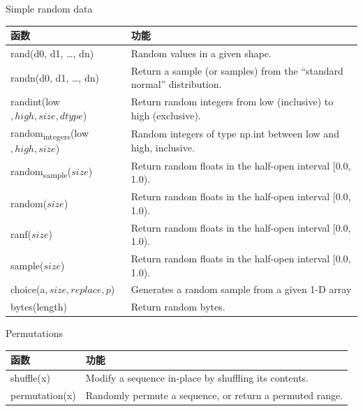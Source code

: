 \documentclass[ignorenonframetext,11pt,xcolor=dvipsnames,hyperref={colorlinks,allcolors=.,urlcolor=blue, citecolor=violet, bookmarksdepth=4},aspectratio=1610]{beamer}
\begin{document}
\begin{frame}{Simple random data}
\protect\hypertarget{simple-random-data}{}

\scriptsize

\begin{longtable}[]{@{}ll@{}}
\toprule
函数 & 功能\tabularnewline
\midrule
\endhead
rand(d0, d1, \ldots, dn) & Random values in a given
shape.\tabularnewline
randn(d0, d1, \ldots, dn) & Return a sample (or samples) from the
``standard normal'' distribution.\tabularnewline
randint(low\(, high, size, dtype\)) & Return random integers from low
(inclusive) to high (exclusive).\tabularnewline
random\textsubscript{integers}(low\(, high, size\)) & Random integers of
type np.int between low and high, inclusive.\tabularnewline
random\textsubscript{sample}(\(size\)) & Return random floats in the
half-open interval {[}0.0, 1.0).\tabularnewline
random(\(size\)) & Return random floats in the half-open interval
{[}0.0, 1.0).\tabularnewline
ranf(\(size\)) & Return random floats in the half-open interval {[}0.0,
1.0).\tabularnewline
sample(\(size\)) & Return random floats in the half-open interval
{[}0.0, 1.0).\tabularnewline
choice(a\(, size, replace, p\)) & Generates a random sample from a given
1-D array\tabularnewline
bytes(length) & Return random bytes.\tabularnewline
\bottomrule
\end{longtable}

\end{frame}

\begin{frame}{Permutations}
\protect\hypertarget{permutations}{}

\scriptsize

\begin{longtable}[]{@{}ll@{}}
\toprule
函数 & 功能\tabularnewline
\midrule
\endhead
shuffle(x) & Modify a sequence in-place by shuffling its
contents.\tabularnewline
permutation(x) & Randomly permute a sequence, or return a permuted
range.\tabularnewline
\bottomrule
\end{longtable}

\end{frame}
\end{document}
